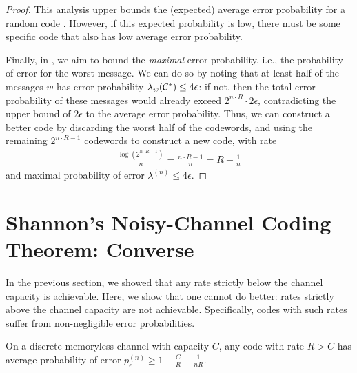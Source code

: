 \begin{proof}
This analysis upper bounds the (expected) average error probability for a random code \cran. However, if this expected probability is low, there must be some specific code \cspec that also has low average error probability.

Finally, in \cspec, we aim to bound the \emph{maximal} error probability, i.e., the probability of error for the worst message. We can do so by noting that at least half of the messages $w$ has error probability $\lambda_w(\mathcal{C}^*) \leq 4 \epsilon$: if not, then the total error probability of these messages would already exceed $2^{n \cdot R} \cdot 2\epsilon$, contradicting the upper bound of $2 \epsilon$ to the average error probability. Thus, we can construct a better code by discarding the worst half of the codewords, and using the remaining $2^{n \cdot R - 1}$ codewords to construct a new code, with rate
\begin{align}
\frac{\log(2^{n\cdot R - 1})}{n} = \frac{n \cdot R - 1}{n} = R - \frac{1}{n}
\end{align}
and maximal probability of error $\lambda^{(n)} \leq 4 \epsilon$.
\end{proof}

\section{Shannon's Noisy-Channel Coding Theorem: Converse}
In the previous section, we showed that any rate strictly below the channel capacity is achievable. Here, we show that one cannot do better: rates strictly above the channel capacity are not achievable. Specifically, codes with such rates suffer from non-negligible error probabilities. 

\begin{theorem}\label{thm:ncc-backward}
On a discrete memoryless channel with capacity $C$, any code with rate $R > C$ has average probability of error $p_e^{(n)} \geq 1 - \frac{C}{R} - \frac{1}{nR}$.
\end{theorem}

